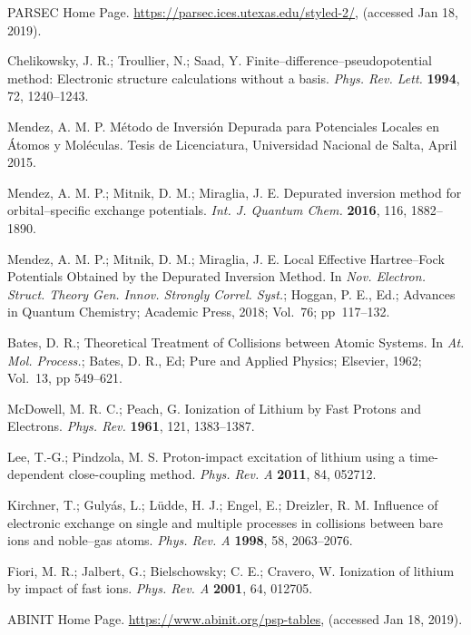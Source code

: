 \documentclass[10pt]{article}
\begin{document}
\begin{thebibliography}{10}

PARSEC Home Page. 
\url{https://parsec.ices.utexas.edu/styled-2/},
(accessed Jan 18, 2019).

Chelikowsky, J. R.; Troullier, N.; Saad, Y.
Finite--difference--pseudopotential method: Electronic structure calculations without a basis.
{\it Phys. Rev. Lett.} {\bf 1994}, 72, 1240--1243.

Mendez, A. M. P.
M\'etodo de Inversi\'on Depurada para Potenciales Locales en \'Atomos y Mol\'eculas.
Tesis de Licenciatura, Universidad Nacional de Salta, April 2015.

Mendez, A. M. P.; Mitnik, D. M.; Miraglia, J. E.
Depurated inversion method for orbital--specific exchange potentials.
{\it Int. J. Quantum Chem.} {\bf 2016}, 116, 1882--1890.

Mendez, A. M. P.; Mitnik, D. M.; Miraglia, J. E. 
Local Effective Hartree--Fock Potentials Obtained by the Depurated Inversion Method. 
In {\it Nov. Electron. Struct. Theory Gen. Innov. Strongly Correl. Syst.}; 
Hoggan, P. E., Ed.; 
Advances in Quantum Chemistry;
Academic Press, 2018;
Vol.~76; pp~117--132.

Bates, D. R.; 
Theoretical Treatment of Collisions between Atomic Systems.
In {\it At. Mol. Process.};
Bates, D. R., Ed;
Pure and Applied Physics;
Elsevier, 1962;
Vol.~13, pp 549--621.

McDowell, M. R. C.; Peach, G.
Ionization of Lithium by Fast Protons and Electrons.
{\it Phys. Rev.} {\bf 1961}, 121, 1383--1387.

Lee, T.-G.; Pindzola, M. S.
Proton-impact excitation of lithium using a time-dependent close-coupling method.
{\it Phys. Rev. A} {\bf 2011}, 84, 052712.

Kirchner, T.; Guly\'as, L.; L\"udde, H. J.; Engel, E.; Dreizler, R. M. 
Influence of electronic exchange on single and multiple processes in 
collisions between bare ions and noble--gas atoms.
{\it Phys. Rev. A} {\bf 1998}, 58, 2063--2076.

Fiori, M. R.; Jalbert, G.; Bielschowsky; C. E.; Cravero, W.
Ionization of lithium by impact of fast ions.
{\it Phys. Rev. A} {\bf 2001}, 64, 012705.

ABINIT Home Page. 
\url{https://www.abinit.org/psp-tables},
(accessed Jan 18, 2019).


\end{thebibliography}
\end{document}
